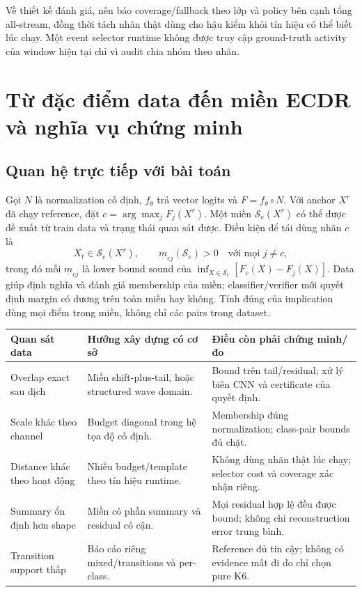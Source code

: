 \documentclass[11pt,a4paper]{article}
\theoremstyle{definition}
\begin{document}
Về thiết kế đánh giá, nên báo coverage/fallback theo lớp và policy bên cạnh
tổng all-stream, đồng thời tách nhãn thật dùng cho hậu kiểm khỏi tín hiệu
có thể biết lúc chạy. Một event selector runtime không được truy cập
ground-truth activity của window hiện tại chỉ vì audit chia nhóm theo nhãn.

\section{Từ đặc điểm data đến miền ECDR và nghĩa vụ chứng minh}
\subsection{Quan hệ trực tiếp với bài toán}
Gọi $N$ là normalization cố định, $f_\theta$ trả vector logits và
$F=f_\theta\circ N$. Với anchor $X^r$ đã chạy reference, đặt
$c=\arg\max_jF_j(X^r)$. Một miền $\mathcal S_e(X^r)$ có thể được đề xuất
từ train data và trạng thái quan sát được. Điều kiện để tái dùng nhãn $c$ là
\begin{equation}\label{eq:cert}
X_t\in\mathcal S_e(X^r),\qquad
\underline m_{cj}(\mathcal S_e)>0\quad\text{với mọi }j\ne c,
\end{equation}
trong đó mỗi $\underline m_{cj}$ là lower bound sound của
$\inf_{X\in\mathcal S_e}[F_c(X)-F_j(X)]$. Data giúp định nghĩa và đánh giá
membership của miền; classifier/verifier mới quyết định margin có dương
trên toàn miền hay không. Tính đúng của implication dùng mọi điểm trong
miền, không chỉ các pairs trong dataset.

\begin{tabularx}{\linewidth}{@{}P{3.1cm}Y Y@{}}\toprule
Quan sát data & Hướng xây dựng có cơ sở & Điều còn phải chứng minh/đo\\\midrule
Overlap exact sau dịch & Miền shift-plus-tail, hoặc structured wave domain. & Bound trên tail/residual; xử lý biên CNN và certificate của quyết định.\\
Scale khác theo channel & Budget diagonal trong hệ tọa độ cố định. & Membership đúng normalization; class-pair bounds đủ chặt.\\
Distance khác theo hoạt động & Nhiều budget/template theo tín hiệu runtime. & Không dùng nhãn thật lúc chạy; selector cost và coverage xác nhận riêng.\\
Summary ổn định hơn shape & Miền có phần summary và residual có cận. & Mọi residual hợp lệ đều được bound; không chỉ reconstruction error trung bình.\\
Transition support thấp & Báo cáo riêng mixed/transitions và per-class. & Reference đủ tin cậy; không có evidence mất đi do chỉ chọn pure K6.\\\bottomrule
\end{tabularx}
\end{document}
